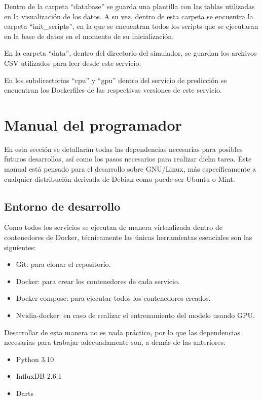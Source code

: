 Dentro de la carpeta ``database'' se guarda una plantilla con las tablas utilizadas en la visualización 
de los datos. A su vez, dentro de esta carpeta se encuentra la carpeta ``init\_scripts'', en la que se encuentran 
todos los scripts que se ejecutaran en la base de datos en el momento de su inicialización.

En la carpeta ``data'', dentro del directorio del simulador, se guardan los archivos CSV utilizados para leer desde 
este servicio. 

En los subdirectorios ``cpu'' y ``gpu'' dentro del servicio de predicción se 
encuentran los Dockerfiles de las respectivas versiones de este servicio.

\section{Manual del programador}

En esta sección se detallarán todas las dependencias necesarias para posibles futuros desarrollos, así como
los pasos necesarios para realizar dicha tarea. Este manual está pensado para el desarrollo sobre GNU/Linux,
más específicamente a cualquier distribución derivada de Debian como puede ser Ubuntu o Mint.

\subsection{Entorno de desarrollo}

Como todos los servicios se ejecutan de manera virtualizada dentro de contenedores de Docker, técnicamente las 
únicas herramientas esenciales son las siguientes:
\begin{itemize}
    \item Git: para clonar el repositorio.
    \item Docker: para crear los contenedores de cada servicio.
    \item Docker compose: para ejecutar todos los contenedores creados.
    \item Nvidia-docker: en caso de realizar el entrenamiento del modelo usando GPU.
\end{itemize}

Desarrollar de esta manera no es nada práctico, por lo que las dependencias necesarias para trabajar adecuadamente son, 
a demás de las anteriores:
\begin{itemize}
    \item Python 3.10
    \item InfluxDB 2.6.1
    \item Darts
\end{itemize}


